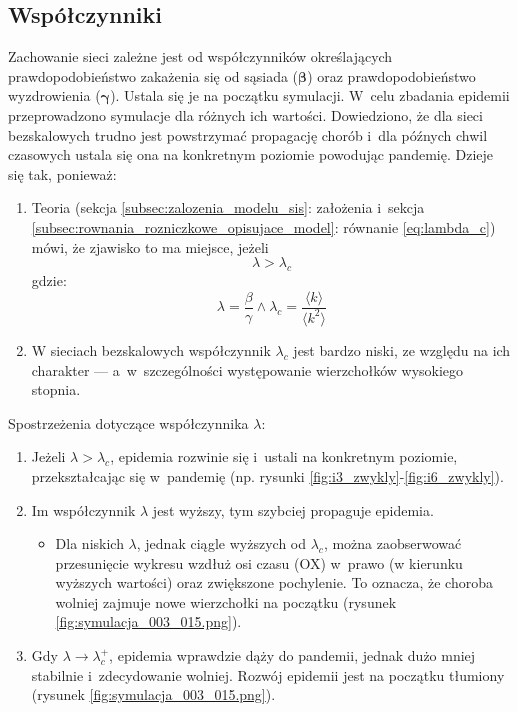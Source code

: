 \begin{enumerate}
\subsection{Współczynniki}
\label{subsec:wnioski_wspolczynniki}

Zachowanie sieci zależne jest od współczynników określających prawdopodobieństwo zakażenia się od sąsiada ($\pmb{\beta}$) oraz prawdopodobieństwo wyzdrowienia ($\pmb{\gamma}$). Ustala się je na początku symulacji. W~celu zbadania epidemii przeprowadzono symulacje dla różnych ich wartości. Dowiedziono, że dla sieci bezskalowych trudno jest powstrzymać propagację chorób i~dla późnych chwil czasowych ustala się ona na konkretnym poziomie powodując pandemię. Dzieje się tak, ponieważ:
\begin{enumerate}[label=\arabic*), nolistsep]
\item Teoria (sekcja \ref{subsec:zalozenia_modelu_sis}: założenia i~sekcja \ref{subsec:rownania_rozniczkowe_opisujace_model}: równanie \ref{eq:lambda_c}) mówi, że zjawisko to ma miejsce, jeżeli \[ \lambda>\lambda_c\] gdzie: \[ \lambda = \frac{\beta}{\gamma} \land \lambda_c = \frac{\langle k \rangle}{\langle k^2 \rangle} \]
\item W sieciach bezskalowych współczynnik $\lambda_c$ jest bardzo niski, ze względu na ich charakter --- a~w~szczególności występowanie wierzchołków wysokiego stopnia.
\end{enumerate}
Spostrzeżenia dotyczące współczynnika $\lambda$:
\begin{enumerate}[label=\arabic*), nolistsep]
\item Jeżeli $\lambda > \lambda_c$, epidemia rozwinie się i~ustali na konkretnym poziomie, przekształcając się w~pandemię (np. rysunki \ref{fig:i3_zwykly}-\ref{fig:i6_zwykly}).
\item Im współczynnik $\lambda$ jest wyższy, tym szybciej propaguje epidemia.
  \begin{itemize}
  \item Dla niskich $\lambda$, jednak ciągle wyższych od $\lambda_c$, można zaobserwować przesunięcie wykresu wzdłuż osi czasu (OX) w~prawo (w kierunku wyższych wartości) oraz zwiększone pochylenie. To oznacza, że choroba wolniej zajmuje nowe wierzchołki na początku (rysunek \ref{fig:symulacja_003_015.png}). 
  \end{itemize}
\item Gdy $\lambda \rightarrow \lambda_c^+$, epidemia wprawdzie dąży do pandemii, jednak dużo mniej stabilnie i~zdecydowanie wolniej. Rozwój epidemii jest na początku tłumiony (rysunek \ref{fig:symulacja_003_015.png}).

\end{enumerate}
\end{enumerate}

